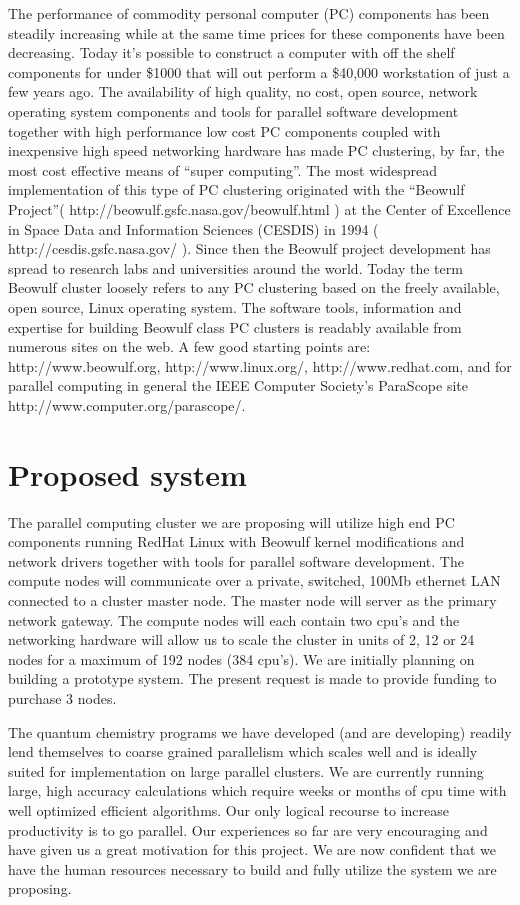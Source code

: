 The performance of commodity personal computer (PC) components has been
steadily increasing while at the same time prices for these components
have
been decreasing. Today it's possible to construct a computer with off
the
shelf components for under \$1000 that will out perform a \$40,000
workstation
of just a few years ago. The availability of high quality, no cost, open
source, network operating system components and tools for parallel
software
development together with high performance low cost PC components
coupled with
inexpensive high speed networking hardware has made PC clustering, by
far, the
most cost effective means of ``super computing''.
The most widespread implementation of this type of PC clustering
originated
with the ``Beowulf Project''( http://beowulf.gsfc.nasa.gov/beowulf.html
) at
the Center of Excellence in Space Data and Information Sciences (CESDIS)
in
1994 ( http://cesdis.gsfc.nasa.gov/ ). Since then the Beowulf project
development has spread to research labs and universities around the
world.
Today the term Beowulf cluster loosely refers to any PC clustering based
on
the freely available, open source, Linux operating system. The software
tools,
information and expertise for building Beowulf class PC clusters is
readably
available from numerous sites on the web. A few good starting points
are:
http://www.beowulf.org, http://www.linux.org/, http://www.redhat.com,
and for
parallel computing in general the
IEEE Computer Society's ParaScope
site http://www.computer.org/parascope/.

\section{Proposed system}

The parallel computing cluster we are proposing will utilize high end PC
components running RedHat Linux with Beowulf kernel modifications and
network
drivers together with tools for parallel software development. The
compute
nodes will communicate over a private, switched, 100Mb ethernet LAN
connected
to a cluster master node. The master node will
server as
the primary network gateway. The compute nodes will each contain two
cpu's and
the networking hardware will allow 
us to scale the cluster in units of
2, 12 or
24 nodes for a maximum of 192 nodes (384 cpu's). 
We are initially
planning
on building a prototype system. The present request is made to provide
funding to purchase 3 nodes.

The quantum chemistry programs we have developed (and are developing)
readily
lend themselves to coarse grained parallelism which scales well and is
ideally
suited for implementation on large parallel clusters. We are currently
running
large, high accuracy calculations which require weeks or months of cpu
time
with well optimized efficient algorithms. Our only logical recourse to
increase productivity is to go parallel. 
Our experiences so far are very encouraging and
have
given us a 
great motivation for this project. We are now confident that
we have
the human resources necessary to build
and fully utilize the system we are proposing.

